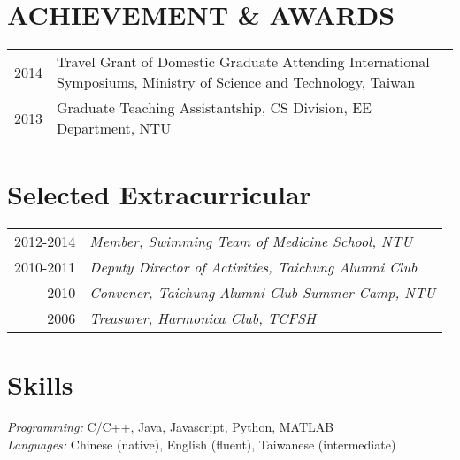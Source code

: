 \documentclass[a4paper,10pt]{article}
\begin{document}
\section{ACHIEVEMENT \& AWARDS}

\begin{tabular}{l|p{14cm}}
    2014 & Travel Grant of Domestic Graduate Attending International Symposiums, Ministry of Science and Technology, Taiwan \\
    2013 & Graduate Teaching Assistantship, CS Division, EE Department, NTU\\
\end{tabular}

\section{Selected  Extracurricular}
\begin{tabular}{r|l}
    2012-2014 & \sl{Member,} Swimming Team of Medicine School, NTU   \\
    2010-2011 & \sl{Deputy Director of Activities,} Taichung Alumni Club \\
    2010      & \sl{Convener,} Taichung Alumni Club Summer Camp, NTU   \\
    2006      & \sl{Treasurer,} Harmonica Club, TCFSH
\end{tabular}

\section{Skills}
{\sl Programming:} C/C++, Java, Javascript, Python, MATLAB\textregistered\\
{\sl Languages:} Chinese (native), English (fluent), Taiwanese (intermediate)


%
\end{document}

